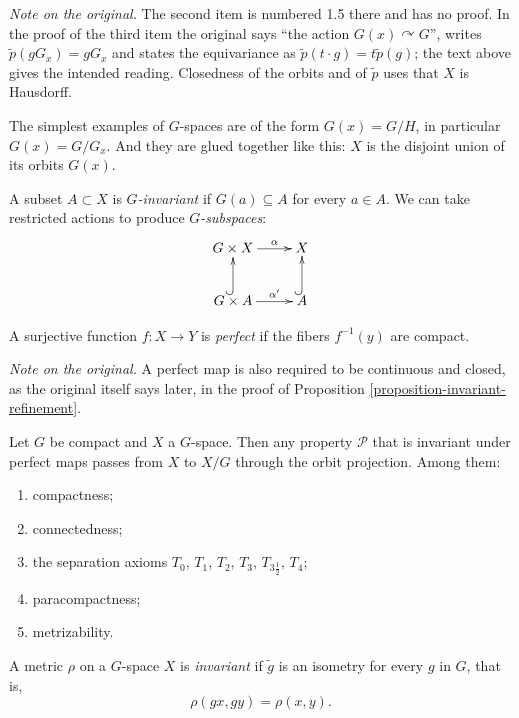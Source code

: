 \noindent
{\it Note on the original.} The second
item is numbered 1.5 there and has no
proof. In the proof of the third item
the original says ``the action
$G(x)\curvearrowright G$'', writes
$\tilde{p}(gG_x)=gG_x$ and states the
equivariance as
$\tilde{p}(t\cdot g)=t\tilde{p}(g)$;
the text above gives the intended
reading. Closedness of the orbits and of
$\tilde{p}$ uses that $X$ is Hausdorff.

The simplest examples of $G$-spaces are
of the form $G(x)=G/H$, in particular
$G(x)=G/G_x$. And they are glued
together like this: $X$ is the disjoint
union of its orbits $G(x)$.

\begin{definition}
\label{definition-invariant-subset}
A subset $A\subset X$ is
{\it $G$-invariant} if
$G(a)\subseteq A$ for every $a\in A$.
We can take restricted actions to
produce {\it $G$-subspaces}:
$$
\xymatrix{
G\times X \ar[r]^-{\alpha} & X \\
G\times A \ar@{^{(}->}[u]
  \ar[r]^-{\alpha'}
  & A \ar@{^{(}->}[u]
}
$$
\end{definition}

\begin{definition}
\label{definition-perfect-map}
A surjective function $f:X\to Y$ is
{\it perfect} if the fibers
$f^{-1}(y)$ are compact.
\end{definition}

\noindent
{\it Note on the original.} A perfect
map is also required to be continuous
and closed, as the original itself says
later, in the proof of
Proposition
\ref{proposition-invariant-refinement}.

\begin{theorem}
\label{theorem-perfect-invariants}
Let $G$ be compact and $X$ a $G$-space.
Then any property $\mathcal{P}$ that is
invariant under perfect maps passes
from $X$ to $X/G$ through the orbit
projection. Among them:
\begin{enumerate}
\item compactness;
\item connectedness;
\item the separation axioms $T_0$,
$T_1$, $T_2$, $T_3$,
$T_{3\frac{1}{2}}$, $T_4$;
\item paracompactness;
\item metrizability.
\end{enumerate}
\end{theorem}

\begin{definition}
\label{definition-invariant-metric}
A metric $\rho$ on a $G$-space $X$ is
{\it invariant} if $\tilde{g}$ is an
isometry for every $g$ in $G$, that is,
$$
\rho(gx,gy)=\rho(x,y).
$$
\end{definition}

